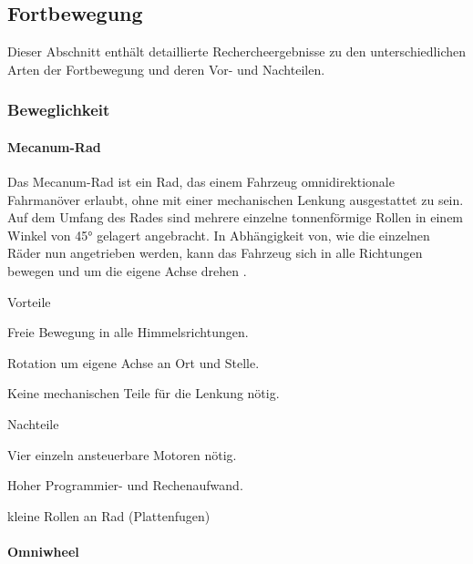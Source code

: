 \documentclass[../main.tex]{subfiles}
\begin{document}
\newpage
\subsection{Fortbewegung}

Dieser Abschnitt enthält detaillierte Rechercheergebnisse zu den unterschiedlichen Arten der Fortbewegung und deren Vor- und Nachteilen.

\subsubsection{Beweglichkeit}

\paragraph{Mecanum-Rad} \label{recherche-mecanum-rad}

Das Mecanum-Rad ist ein Rad, das einem Fahrzeug omnidirektionale Fahrmanöver erlaubt, ohne mit einer mechanischen Lenkung ausgestattet zu sein.
Auf dem Umfang des Rades sind mehrere einzelne tonnenförmige Rollen in einem Winkel von 45° gelagert angebracht. 
In Abhängigkeit von, wie die einzelnen Räder nun angetrieben werden, kann das Fahrzeug sich in alle Richtungen bewegen und um die eigene Achse drehen \cite{mecanum_rad}.

\begin{minipage}[t]{0.48\textwidth}
    \begin{items}
      \item [Vorteile]
      \item Freie Bewegung in alle Himmelsrichtungen.
      \item Rotation um eigene Achse an Ort und Stelle.
      \item Keine mechanischen Teile für die Lenkung nötig.
 \end{items}
\end{minipage}
\hfill
\begin{minipage}[t]{0.48\textwidth}
    \begin{items}
      \item [Nachteile]
      \item Vier einzeln ansteuerbare Motoren nötig.
      \item Hoher Programmier- und Rechenaufwand.
      \item kleine Rollen an Rad (Plattenfugen)
    \end{items}
\end{minipage}

\paragraph{Omniwheel} \label{recherche-omniwheel}
\end{document}
